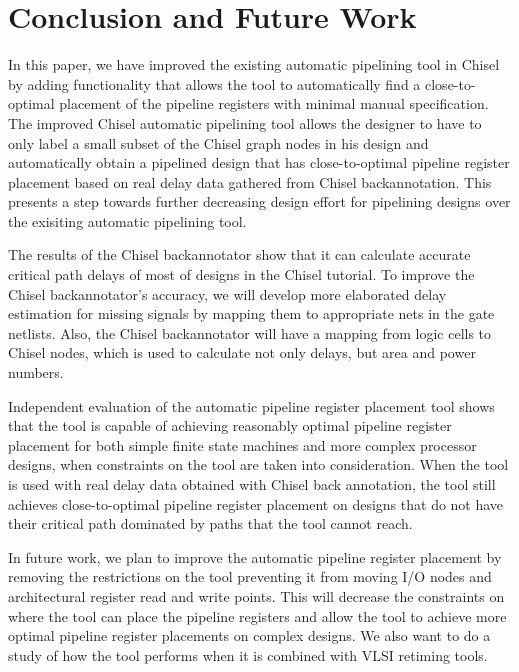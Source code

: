 \section{Conclusion and Future Work}
In this paper, we have improved the existing automatic pipelining tool in Chisel by adding functionality that allows the tool to automatically find a close-to-optimal placement of the pipeline registers with minimal manual specification. The improved Chisel automatic pipelining tool allows the designer to have to only label a small subset of the Chisel graph nodes in his design and automatically obtain a pipelined design that has close-to-optimal pipeline register placement based on real delay data gathered from Chisel backannotation. This presents a step towards further decreasing design effort for pipelining designs over the exisiting automatic pipelining tool.

The results of the Chisel backannotator show that it can calculate accurate critical path delays of most of designs in the Chisel tutorial. To improve the Chisel backannotator's accuracy, we will develop more elaborated delay estimation for missing signals by mapping them to appropriate nets in the gate netlists. Also, the Chisel backannotator will have a mapping from logic cells to Chisel nodes, which is used to calculate not only delays, but area and power numbers.

Independent evaluation of the automatic pipeline register placement tool shows that the tool is capable of achieving reasonably optimal pipeline register placement for both simple finite state machines and more complex processor designs, when constraints on the tool are taken into consideration. When the tool is used with real delay data obtained with Chisel back annotation, the tool still achieves close-to-optimal pipeline register placement on designs that do not have their critical path dominated by paths that the tool cannot reach.

In future work, we plan to improve the automatic pipeline register placement by removing the restrictions on the tool preventing it from moving I/O nodes and architectural register read and write points. This will decrease the constraints on where the tool can place the pipeline registers and allow the tool to achieve more optimal pipeline register placements on complex designs. We also want to do a study of how the tool performs when it is combined with VLSI retiming tools.
